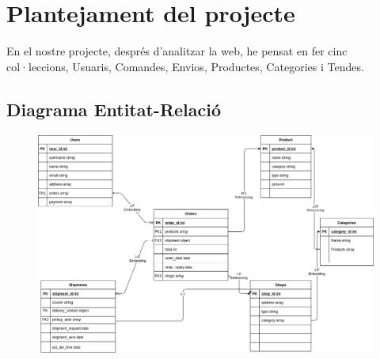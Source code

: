

\setcounter{page}{1} %

\section{Plantejament del projecte}

En el nostre projecte, després d'analitzar la web, he pensat en fer cinc col·leccions, 
Usuaris, Comandes, Envios, Productes, Categories i Tendes.

\subsection{Diagrama Entitat-Relació}

\begin{figure}[htpb!]
	\centering
\includegraphics[width=400pt]{figures/Relació.png} 
\end{figure}

\newpage

